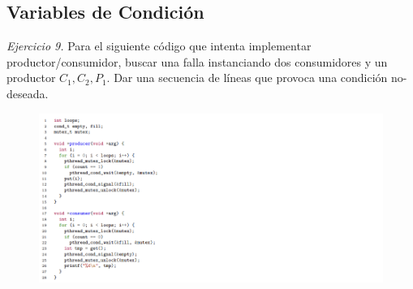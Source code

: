 \documentclass[12pt]{article}
\begin{document}
\subsection*{Variables de Condición}

\noindent \textit{Ejercicio 9.} Para el siguiente código que intenta implementar productor/consumidor, buscar una falla instanciando dos consumidores y un productor $C_{1}, C_{2}, P_{1}$. Dar una secuencia de líneas que provoca una condición no-deseada.

\begin{figure}[h]
    \centering
    \includegraphics[width=1\textwidth]{c7.png}
\end{figure}
\end{document}
